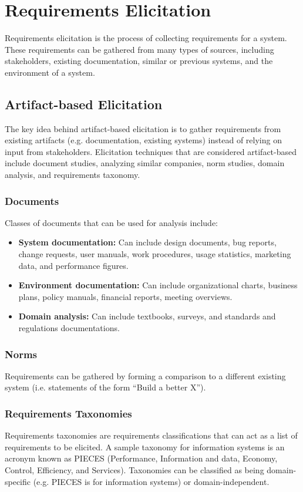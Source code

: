 \documentclass[12pt,titlepage]{article}
\begin{document}
  \newpage

  \section{Requirements Elicitation}
    Requirements elicitation is the process of collecting requirements for a system. These requirements can be gathered from many types of sources,
    including stakeholders, existing documentation, similar or previous systems, and the environment of a system.

    \subsection{Artifact-based Elicitation}
      The key idea behind artifact-based elicitation is to gather requirements from existing artifacts (e.g. documentation, existing systems)
      instead of relying on input from stakeholders. Elicitation techniques that are considered artifact-based include
      document studies, analyzing similar companies, norm studies, domain analysis, and requirements taxonomy.

      \subsubsection{Documents}
        Classes of documents that can be used for analysis include:
        \begin{itemize}
          \item \textbf{System documentation:} Can include design documents, bug reports, change requests, user manuals, work procedures, usage statistics,
          marketing data, and performance figures.
          \item \textbf{Environment documentation:} Can include organizational charts, business plans, policy manuals, financial reports, meeting overviews.
          \item \textbf{Domain analysis:} Can include textbooks, surveys, and standards and regulations documentations.
        \end{itemize}

      \subsubsection{Norms}
        Requirements can be gathered by forming a comparison to a different existing system (i.e. statements of the form ``Build a better X'').

      \subsubsection{Requirements Taxonomies}
        Requirements taxonomies are requirements classifications that can act as a list of requirements to be elicited. A sample taxonomy for information
        systems is an acronym known as PIECES (Performance, Information and data, Economy, Control, Efficiency, and Services). Taxonomies can be classified
        as being domain-specific (e.g. PIECES is for information systems) or domain-independent.
\end{document}
